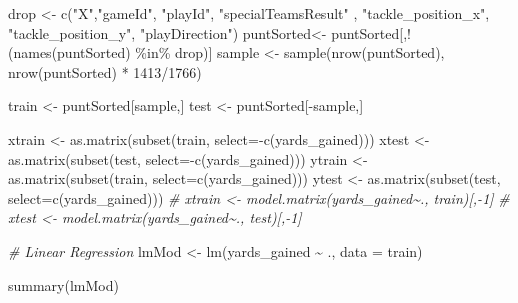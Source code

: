 \documentclass[
]{article}
\newenvironment{Shaded}{\begin{snugshade}}{\end{snugshade}}
\newcommand{\AttributeTok}[1]{\textcolor[rgb]{0.77,0.63,0.00}{#1}}
\newcommand{\CommentTok}[1]{\textcolor[rgb]{0.56,0.35,0.01}{\textit{#1}}}
\newcommand{\DecValTok}[1]{\textcolor[rgb]{0.00,0.00,0.81}{#1}}
\newcommand{\FunctionTok}[1]{\textcolor[rgb]{0.00,0.00,0.00}{#1}}
\newcommand{\NormalTok}[1]{#1}
\newcommand{\OtherTok}[1]{\textcolor[rgb]{0.56,0.35,0.01}{#1}}
\newcommand{\SpecialCharTok}[1]{\textcolor[rgb]{0.00,0.00,0.00}{#1}}
\newcommand{\StringTok}[1]{\textcolor[rgb]{0.31,0.60,0.02}{#1}}
\begin{document}
\begin{Shaded}
\begin{Highlighting}[]
\NormalTok{drop }\OtherTok{\textless{}{-}} \FunctionTok{c}\NormalTok{(}\StringTok{"X"}\NormalTok{,}\StringTok{"gameId"}\NormalTok{, }\StringTok{"playId"}\NormalTok{, }\StringTok{"specialTeamsResult"}\NormalTok{ , }\StringTok{"tackle\_position\_x"}\NormalTok{, }\StringTok{"tackle\_position\_y"}\NormalTok{, }\StringTok{"playDirection"}\NormalTok{)}
\NormalTok{puntSorted}\OtherTok{\textless{}{-}}\NormalTok{ puntSorted[,}\SpecialCharTok{!}\NormalTok{(}\FunctionTok{names}\NormalTok{(puntSorted) }\SpecialCharTok{\%in\%}\NormalTok{ drop)]}
\NormalTok{sample }\OtherTok{\textless{}{-}} \FunctionTok{sample}\NormalTok{(}\FunctionTok{nrow}\NormalTok{(puntSorted), }\FunctionTok{nrow}\NormalTok{(puntSorted) }\SpecialCharTok{*} \DecValTok{1413}\SpecialCharTok{/}\DecValTok{1766}\NormalTok{)}

\NormalTok{train }\OtherTok{\textless{}{-}}\NormalTok{ puntSorted[sample,]}
\NormalTok{test }\OtherTok{\textless{}{-}}\NormalTok{ puntSorted[}\SpecialCharTok{{-}}\NormalTok{sample,]}

\NormalTok{xtrain }\OtherTok{\textless{}{-}} \FunctionTok{as.matrix}\NormalTok{(}\FunctionTok{subset}\NormalTok{(train, }\AttributeTok{select=}\SpecialCharTok{{-}}\FunctionTok{c}\NormalTok{(yards\_gained)))}
\NormalTok{xtest }\OtherTok{\textless{}{-}} \FunctionTok{as.matrix}\NormalTok{(}\FunctionTok{subset}\NormalTok{(test, }\AttributeTok{select=}\SpecialCharTok{{-}}\FunctionTok{c}\NormalTok{(yards\_gained)))}
\NormalTok{ytrain }\OtherTok{\textless{}{-}} \FunctionTok{as.matrix}\NormalTok{(}\FunctionTok{subset}\NormalTok{(train, }\AttributeTok{select=}\FunctionTok{c}\NormalTok{(yards\_gained)))}
\NormalTok{ytest }\OtherTok{\textless{}{-}} \FunctionTok{as.matrix}\NormalTok{(}\FunctionTok{subset}\NormalTok{(test, }\AttributeTok{select=}\FunctionTok{c}\NormalTok{(yards\_gained)))}
\CommentTok{\# xtrain \textless{}{-} model.matrix(yards\_gained\textasciitilde{}., train)[,{-}1]}
\CommentTok{\# xtest \textless{}{-} model.matrix(yards\_gained\textasciitilde{}., test)[,{-}1]}
\end{Highlighting}
\end{Shaded}

\begin{Shaded}
\begin{Highlighting}[]
\CommentTok{\# Linear Regression}
\NormalTok{lmMod }\OtherTok{\textless{}{-}} \FunctionTok{lm}\NormalTok{(yards\_gained }\SpecialCharTok{\textasciitilde{}}\NormalTok{ ., }\AttributeTok{data =}\NormalTok{ train)}

\FunctionTok{summary}\NormalTok{(lmMod)}
\end{Highlighting}
\end{Shaded}
\end{document}
